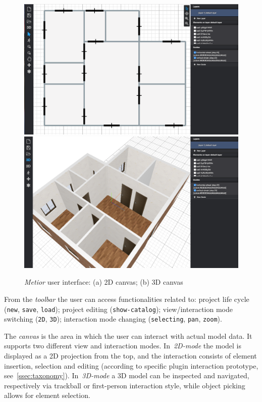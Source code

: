 \begin{figure}[htbp] %
   \centering
   \includegraphics[width=1\linewidth]{images/2d}
   \label{fig:ui}
   \includegraphics[width=1\linewidth]{images/3d}
   \caption{\emph{Metior} user interface: (a) 2D canvas; (b) 3D canvas}
   \label{fig:ui2}
\end{figure}

From the \emph{toolbar} the user can access functionalities related to: project life cycle ({\tt new}, {\tt save}, {\tt load}); project editing  ({\tt  show-catalog}); view/interaction mode switching ({\tt 2D}, {\tt  3D}); interaction mode changing ({\tt  selecting}, {\tt pan}, {\tt zoom}).


The \emph{canvas} is the area in which the user can interact with actual model data. It supports two different view and interaction modes. In~\emph{2D-mode} the model is displayed as a 2D projection from the top, and the interaction consists of element insertion, selection and editing (according to specific plugin interaction prototype, see~\ref{ssec:taxonomy}). In~\emph{3D-mode} a 3D model can be inspected and navigated, respectively via trackball or first-person interaction style, while object picking allows for element selection.

